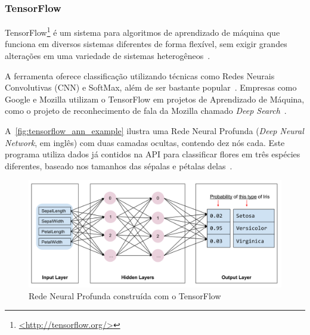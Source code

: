 

\subsubsection{TensorFlow}\label{sec:ml_tf}

TensorFlow\footnote{\href{http://tensorflow.org/}{<http://tensorflow.org/>}} é um sistema para algoritmos de aprendizado de máquina que funciona em diversos sistemas diferentes de forma flexível, sem exigir grandes alterações em uma variedade de sistemas heterogêneos~\cite{abadi:2016}.

A ferramenta oferece classificação utilizando técnicas como Redes Neurais Convolutivas (CNN) e SoftMax, além de ser bastante popular~\cite{ertram:2017}. Empresas como Google e Mozilla utilizam o TensorFlow em projetos de Aprendizado de Máquina, como o projeto de reconhecimento de fala da Mozilla chamado \textit{Deep Search}~\cite{tensorflow:uses}.

A~\autoref{fig:tensorflow_ann_example} ilustra uma Rede Neural Profunda (\textit{Deep Neural Network}, em inglês) com duas camadas ocultas, contendo dez nós cada. Este programa utiliza dados já contidos na API para classificar flores em três espécies diferentes, baseado nos tamanhos das sépalas e pétalas delas~\cite{tensorflow:premade_estimators}.

\begin{figure}[ht]
	\caption{\label{fig:tensorflow_ann_example}Rede Neural Profunda construída com o TensorFlow}
	\begin{center}
	    \includegraphics[width=\textwidth]{resources/tensorflow_ann_example}
	\end{center}
\end{figure}

